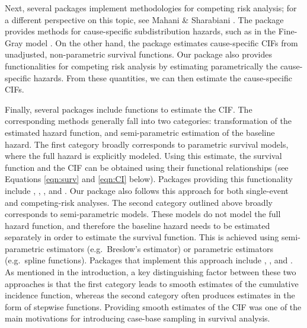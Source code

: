 \documentclass[
]{jss}
\begin{document}
Next, several  packages implement methodologies for
competing risk analysis; for a different perspective on this topic, see
Mahani \& Sharabiani \citeyearpar{mahani2015bayesian}. The package
 provides methods for cause-specific subdistribution
hazards, such as in the Fine-Gray model
\citeyearpar{fine1999proportional}. On the other hand, the package
 estimates cause-specific CIFs from unadjusted, non-parametric
survival functions. Our package  also provides
functionalities for competing risk analysis by estimating parametrically
the cause-specific hazards. From these quantities, we can then estimate
the cause-specific CIFs.

Finally, several packages include functions to estimate the CIF. The
corresponding methods generally fall into two categories: transformation
of the estimated hazard function, and semi-parametric estimation of the
baseline hazard. The first category broadly corresponds to parametric
survival models, where the full hazard is explicitly modeled. Using this
estimate, the survival function and the CIF can be obtained using their
functional relationships (see Equations \ref{eqn:surv} and \ref{eqn:CI}
below). Packages providing this functionality include ,
, , and . Our package
 also follows this approach for both single-event and
competing-risk analyses. The second category outlined above broadly
corresponds to semi-parametric models. These models do not model the
full hazard function, and therefore the baseline hazard needs to be
estimated separately in order to estimate the survival function. This is
achieved using semi-parametric estimators (e.g.~Breslow's estimator) or
parametric estimators (e.g.~spline functions). Packages that implement
this approach include , , and
. As mentioned in the introduction, a key distinguishing
factor between these two approaches is that the first category leads to
smooth estimates of the cumulative incidence function, whereas the
second category often produces estimates in the form of stepwise
functions. Providing smooth estimates of the CIF was one of the main
motivations for introducing case-base sampling in survival analysis.
\end{document}
